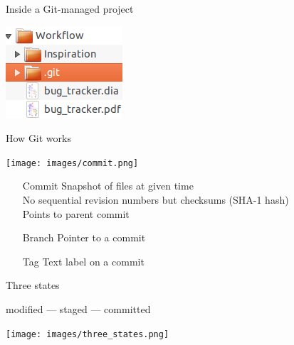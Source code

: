 \documentclass{beamer}
\begin{document}
\begin{frame}{Inside a Git-managed project}
  \begin{center}
    \includegraphics{images/directory_structure.png}
  \end{center}
\end{frame}

\begin{frame}{How Git works}
  \begin{center}
    \texttt{[image: images/commit.png]}
  \end{center}
  \begin{itemize}
  \item[Commit] Snapshot of files at given time\\No sequential revision numbers but checksums (SHA-1 hash)\\Points to parent commit
  \item[Branch] Pointer to a commit
  \item[Tag] Text label on a commit
  \end{itemize}
\end{frame}

\begin{frame}{Three states}
  \begin{center}
    modified --- staged --- committed
  \end{center}
  \begin{center}
    \texttt{[image: images/three\_states.png]}
  \end{center}
\end{frame}
\end{document}
